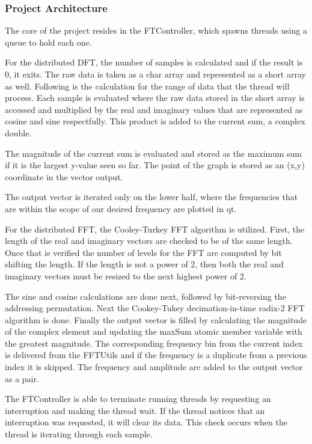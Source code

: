 \documentclass[journal]{IEEEtran}
\begin{document}
\subsubsection{Project Architecture}
    \par{The core of the project resides in the FTController, which spawns threads using a queue to hold each one.}
    \par{For the distributed DFT, the number of samples is calculated and if the result is 0, it exits. The raw data is taken as a char array and represented as a short array as well. Following is the calculation for the range of data that the thread will process. Each sample is evaluated where the raw data stored in the short array is accessed and multiplied by the real and imaginary values that are represented as cosine and sine respectfully. This product is added to the current sum, a complex double.}
    \par{The magnitude of the current sum is evaluated and stored as the maximum sum if it is the largest y-value seen so far. The point of the graph is stored as an (x,y) coordinate in the vector output.}
    \par{The output vector is iterated only on the lower half, where the frequencies that are within the scope of our desired frequency are plotted in qt.}
    \par{For the distributed FFT, the Cooley-Turkey FFT algorithm is utilized. First, the length of the real and imaginary vectors are checked to be of the same length. Once that is verified the number of levels for the FFT are computed by bit shifting the length. If the length is not a power of 2, then both the real and imaginary vectors must be resized to the next highest power of 2. }
    \par{The sine and cosine calculations are done next, followed by bit-reversing the addressing permutation. Next the Cookey-Tukey decimation-in-time radix-2 FFT algorithm is done. Finally the output vector is filled by calculating the magnitude of the complex element and updating the maxSum atomic member variable with the greatest magnitude.  The corresponding frequency bin from the current index is delivered from the FFTUtils and if the frequency is a duplicate from a previous index it is skipped. The frequency and amplitude are added to the output vector as a pair.}
    \par{The FTController is able to terminate running threads by requesting an interruption and making the thread wait. If the thread notices that an interruption was requested, it will clear its data.  This check occurs when the thread is iterating through each sample.}
\end{document}
